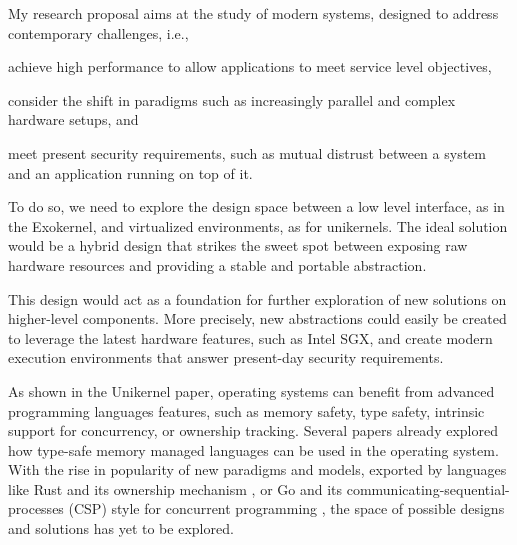 My research proposal aims at the study of modern systems, designed to address contemporary challenges, i.e.,
\begin{enumerate*}
	\item achieve high performance to allow applications to meet service level objectives,
	\item consider the shift in paradigms such as increasingly parallel and complex hardware setups, and
	\item meet present security requirements, such as mutual distrust between a system and an application running on top of it.
\end{enumerate*}
To do so, we need to explore the design space between a low level interface, as in the Exokernel, and virtualized environments, as for unikernels.
The ideal solution would be a hybrid design that strikes the sweet spot between exposing raw hardware resources and providing a stable and portable abstraction.

This design would act as a foundation for further exploration of new solutions on higher-level components. 
More precisely, new abstractions could easily be created to leverage the latest hardware features, such as Intel SGX, and create modern execution environments that answer present-day security requirements.

As shown in the Unikernel paper, operating systems can benefit from advanced programming languages features, such as memory safety, type safety, intrinsic support for concurrency, or ownership tracking.
Several papers \cite{DBLP:conf/asplos/MadhavapeddyMRSSGSHC13,DBLP:conf/sosp/BershadSPSFBCE95,DBLP:journals/sigops/HuntL07} already explored how type-safe memory managed languages can be used in the operating system.
With the rise in popularity of new paradigms and models, exported by languages like Rust and its ownership mechanism \cite{rust}, or Go and its communicating-sequential-processes (CSP) style for concurrent programming \cite{golang}, the space of possible designs and solutions has yet to be explored.